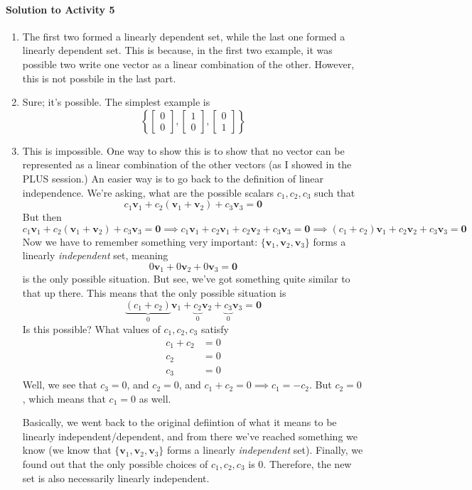 \documentclass[titlepage, a4paper, 10pt]{article}
\renewcommand{\vec}[1]{\mathbf{#1}}
\begin{document}
\paragraph{Solution to Activity 5}
\begin{enumerate}
	\item The first two formed a linearly dependent set, while the last one formed a linearly dependent set. This is because, in the first two example, it was 
		possible two write one vector as a linear combination of the other. However, this is not possbile in the last part. 
	\item Sure; it's possible. The simplest example is \[\left\{\begin{bmatrix}0 \\ 0 \end{bmatrix}, \begin{bmatrix}1 \\ 0 \end{bmatrix}, \begin{bmatrix}0 \\ 1\end{bmatrix}\right\}\]
	\item This is impossible. One way to show this is to show that no vector can be represented as a linear combination of the other vectors (as I showed in 
		the PLUS session.) An easier way is to go back to the definition of linear independence. We're asking, what are the possible scalars \(c_1, c_2, c_3\) 
		such that \[c_1\vec{v}_1 + c_2(\vec{v}_1 + \vec{v}_2) + c_3\vec{v}_3 = \vec{0}\] 
		But then 
		\[c_1\vec{v}_1 + c_2(\vec{v}_1 + \vec{v}_2) + c_3\vec{v}_3 = \vec{0} \implies c_1\vec{v}_1 + c_2\vec{v}_1 + c_2\vec{v}_2 + c_3\vec{v}_3 = 
		\vec{0} \implies (c_1 + c_2)\vec{v}_1 + c_2\vec{v}_2 + c_3\vec{v}_3 = \vec{0}\]
		Now we have to remember something very important: \(\{\vec{v}_1, \vec{v}_2, \vec{v}_3\}\) forms a linearly \emph{independent} set, meaning
		\[0\vec{v}_1 + 0\vec{v}_2 + 0\vec{v}_3 = \vec{0}\] is the only possible situation. But see, we've got something quite similar to that up there. This 
		means that the only possible situation is
		\[\underbrace{(c_1 + c_2)}_{0}\vec{v}_1 + \underbrace{c_2}_{0}\vec{v}_2 + \underbrace{c_3}_{0}\vec{v}_3 = \vec{0}\] Is this possible? What 
		values of \(c_1, c_2, c_3\) satisfy
		\begin{align}
			c_1 + c_2 &= 0 \\
			c_2 &= 0 \\
			c_3 &= 0
		\end{align}
		Well, we see that \(c_3 = 0\), and \(c_2 = 0\), and \(c_1 + c_2 = 0 \implies c_1 = -c_2\). But \(c_2 = 0\), which means that \(c_1 = 0\) as well.

		Basically, we went back to the original defiintion of what it means to be linearly independent/dependent, and from there we've reached something we 
		know (we know that \(\{\vec{v}_1, \vec{v}_2, \vec{v}_3\}\) forms a linearly \emph{independent} set). Finally, we found out that the only possible 
		choices of \(c_1, c_2, c_3\) is 0. Therefore, the new set is also necessarily linearly independent.
\end{enumerate}
\end{document}
